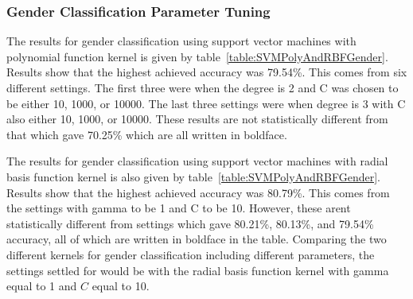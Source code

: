 \documentclass[a4paper]{llncs}
\begin{document}

  
\subsubsection{Gender Classification Parameter Tuning} 
The results for gender classification using support vector machines with polynomial function kernel is given by table~\ref{table:SVMPolyAndRBFGender}. Results show  that the highest achieved accuracy was 79.54\%. This comes from six different settings. The first three were when the degree is 2 and C was chosen to be either 10, 1000, or 10000. The last three settings were when degree is 3 with C also either 10, 1000, or 10000. These results are not statistically different from that which gave 70.25\% which are all written in boldface. 


The results for gender classification using support vector machines with radial basis function kernel is also given by table~\ref{table:SVMPolyAndRBFGender}. Results show  that the highest achieved accuracy was 80.79\%. This comes from the settings with gamma to be 1 and C to be 10. However, these arent statistically different from settings which gave 80.21\%, 80.13\%, and 79.54\% accuracy, all of which are written in boldface in the table. Comparing the two different kernels for gender classification including different parameters, the settings settled for would be with the radial basis function kernel with gamma equal to 1 and $C$ equal to 10.  
\end{document}
